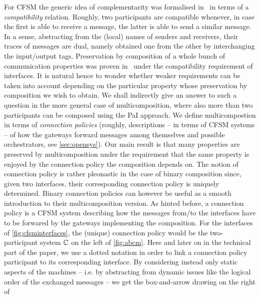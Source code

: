 For CFSM the generic idea of complementarity was formalised in~\cite{BdLH19} in terms of
a {\em compatibility} relation.
Roughly, two participants are compatible whenever, in case the first is able to receive a message, 
the latter is able to send a similar message.
In a sense, abstracting from the (local) names of senders and receivers, their traces of
messages are dual, namely obtained one from the other by interchanging the input/output tags. 
Preservation by composition of a whole bunch of communication properties was proven in~\cite{BdLH19}
under the compatibility requirement of interfaces.
It is natural hence to wonder whether weaker requirements can be taken into account
depending on the particular property whose preservation by composition we wish to obtain.
We shall indirectly give an answer to such a question in the more general case of multicomposition,
where also more than two participants can be composed using the PaI approach.
We define multicompostion in terms of {\em connection policies} (roughly, descriptions -- in terms of CFSM systems -- of how the gateways forward messages among themselves and possible orchestrators, see \cref{sec:opensys}). Our main result is %
that many properties are preserved by multicomposition under the requirement that
the same property is enjoyed by the connection policy the composition depends on. 
The notion of connection policy is rather pleonastic in the case of binary composition since, given two interfaces, their corresponding connection policy is uniquely determined.  
Binary connection policies can however be useful as a smooth introduction to their multicomposition
version.
As hinted before, a connection policy is a CFSM system describing how the messages
from/to the interfaces have to be forwared by the gateways implementing the composition.
For the interfaces of \cref{fig:cfsminterfaces}, the (unique) connection policy would be
the two-participant system $\mathbb{C}$ on the left of \cref{fig:abcm}.
Here and later on in the technical part of the paper, we use a dotted notation in order to
link a connection policy participant to its corresponding interface. 
By considering instead only static aspects of the machines -- i.e. by abstracting from dynamic issues like   
the logical order of the exchanged messages -- we get the box-and-arrow drawing on the right of 
